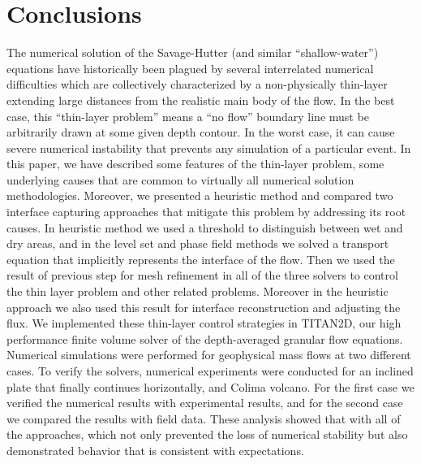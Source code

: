 \documentclass[letterpaper,10pt]{article}
\begin{document}
\section{Conclusions} \label{conclusions}
The numerical solution of the Savage-Hutter (and similar 
``shallow-water'') equations have historically been plagued by 
several interrelated numerical difficulties which are collectively characterized by a non-physically thin-layer extending large distances from the realistic main body of the flow. 
In the best case, this ``thin-layer problem'' means a ``no flow'' boundary line must be arbitrarily drawn at some given depth contour.  In 
the worst case, it can cause severe numerical instability that 
prevents any simulation of a particular event.
In this paper, we 
have described some features of the thin-layer problem,
some underlying causes that are common to virtually all numerical 
solution methodologies.  Moreover, we presented a heuristic method and compared 
two interface capturing approaches that 
mitigate this problem by addressing its root causes. In heuristic method we used a threshold to distinguish between wet and dry areas, and in the level set and phase field methods we solved a 
transport equation that implicitly represents the interface of the flow. Then we used the result of previous step for mesh refinement in all of the three solvers to control the thin layer problem and other related problems. Moreover in the heuristic approach we also used this result for interface reconstruction  and adjusting the flux. 
We implemented these thin-layer control strategies in TITAN2D, our high 
performance finite volume solver of the depth-averaged granular 
flow equations.  Numerical simulations were performed for 
geophysical mass flows at two different cases.
To verify the solvers, numerical experiments were conducted for an inclined plate that finally continues horizontally, and Colima volcano. For the first case we verified the numerical results 
with experimental results, and for the second case we compared the results with field data. These analysis showed that with all of the approaches,
which not only prevented the loss of numerical stability but also demonstrated behavior that is consistent with expectations.
%
\end{document}
